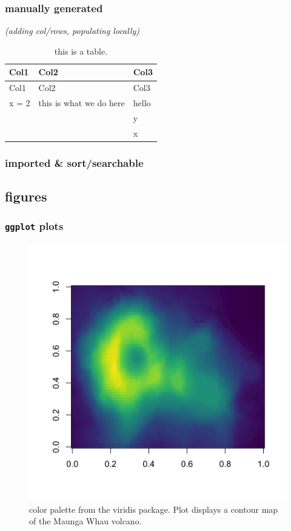 \documentclass[
]{article}
\begin{document}
\hypertarget{manually-generated}{%
\subsubsection{manually generated}\label{manually-generated}}

\emph{(adding col/rows, populating locally)}

\begin{longtable}[]{@{}lll@{}}
\caption{this is a table.}\tabularnewline
\toprule
Col1 & Col2 & Col3 \\
\midrule
\endfirsthead
\toprule
Col1 & Col2 & Col3 \\
\midrule
\endhead
x = 2 & this is what we do here & hello \\
& & y \\
& & x \\
\bottomrule
\end{longtable}

\hypertarget{imported-sortsearchable}{%
\subsubsection{imported \&
sort/searchable}\label{imported-sortsearchable}}

\hypertarget{figures}{%
\subsection{figures}\label{figures}}

\hypertarget{ggplot-plots}{%
\subsubsection{\texorpdfstring{\texttt{ggplot}
plots}{ggplot plots}}\label{ggplot-plots}}

\begin{figure}
\centering
\includegraphics{figures/my-chunk-1.png}
\caption{color palette from the viridis package. Plot displays a contour
map of the Maunga Whau volcano.}
\end{figure}
\end{document}
